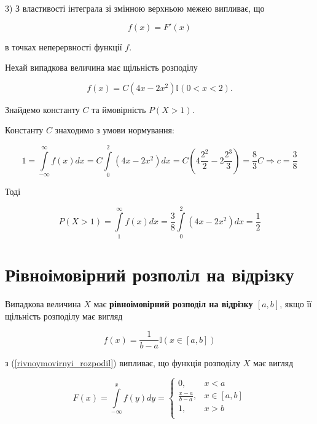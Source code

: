 3) З властивості інтеграла зі змінною верхньою межею випливає, що

\begin{equation}
    f(x) = F'(x)
\end{equation}

в точках неперервності функції $f$.

\begin{example}
    Нехай випадкова величина має щільність розподілу
    
    $$f(x) = C (4x -2x^2)\mathbb{I}(0 < x < 2).$$
    
    Знайдемо константу $C$ та ймовірність $P(X > 1)$.
    
    Константу $C$ знаходимо з умови нормування:
    
    $$1 = \int\limits_{-\infty}^{\infty} f(x) dx
    = C \int\limits_{0}^{2} (4x -2x^2) dx
    = C (4 \frac{2^2}{2} - 2 \frac{2^3}{3})
    = \frac{8}{3} C \Rightarrow c = \frac{3}{8}$$
    
    Тоді

    $$P(X > 1) = \int\limits_{1}^{\infty} f(x) dx
    = \frac{3}{8} \int\limits_{0}^{2} (4x -2x^2) dx
    = \frac{1}{2}$$
\end{example}

\section{Рівноімовірний розполіл на відрізку}

\begin{definition}
    
\end{definition}
Випадкова величина $X$ має \textbf{рівноімовірний розподіл на відрізку $[a, b]$},
якщо її щільність розподілу має вигляд

\begin{equation}
    \label{rivnoymovirnyi_rozpodil}
    f(x) = \frac{1}{b-a} \mathbb{I}(x \in [a, b])
\end{equation}

з (\ref{rivnoymovirnyi_rozpodil}) випливає, що функція розподілу $X$ має вигляд

\begin{equation}
    F(x) = \int\limits_{-\infty}^{x} f(y) dy
    = \left\{\begin{array}{ll}
        0, & x < a \\
        \frac{x-a}{b-a}, & x \in [a, b] \\
        1, & x > b \\
    \end{array}\right.
\end{equation}

